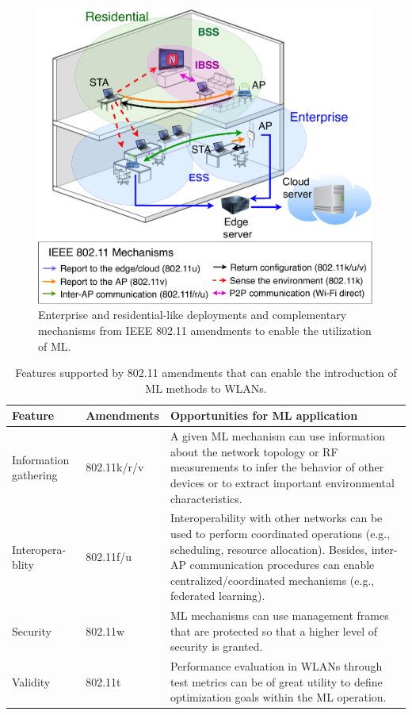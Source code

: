 \documentclass[twocolumn]{article}
\begin{document}
\begin{figure}[ht!]
	\centering
	\includegraphics[width=\columnwidth]{overview_learning_approaches}
	\caption{Enterprise and residential-like deployments and complementary mechanisms from IEEE 802.11 amendments to enable the utilization of ML.}
	\label{fig:overview_learning_approaches}
\end{figure}

\begin{table}[t!]
\caption{Features supported by 802.11 amendments that can enable the introduction of ML methods to WLANs.}
\label{tab:opportunities_amendments}
\centering
\begin{tabular}{|p{}|p{}|p{}|}
\hline
\textbf{Feature} & \textbf{Amendments} & \textbf{Opportunities for ML application} \\\hline
Information gathering & 802.11k/r/v & A given ML mechanism can use information about the network topology or RF measurements to infer the behavior of other devices or to extract important environmental characteristics.\\\hline
Interopera-blity & 802.11f/u & Interoperability with other networks can be used to perform coordinated operations (e.g., scheduling, resource allocation). Besides, inter-AP communication procedures can enable centralized/coordinated mechanisms (e.g., federated learning). \\\hline
Security & 802.11w & ML mechanisms can use management frames that are protected so that a higher level of security is granted.\\\hline
Validity & 802.11t & Performance evaluation in WLANs through test metrics can be of great utility to define optimization goals within the ML  operation.\\\hline
\end{tabular}
\end{table}
\end{document}
